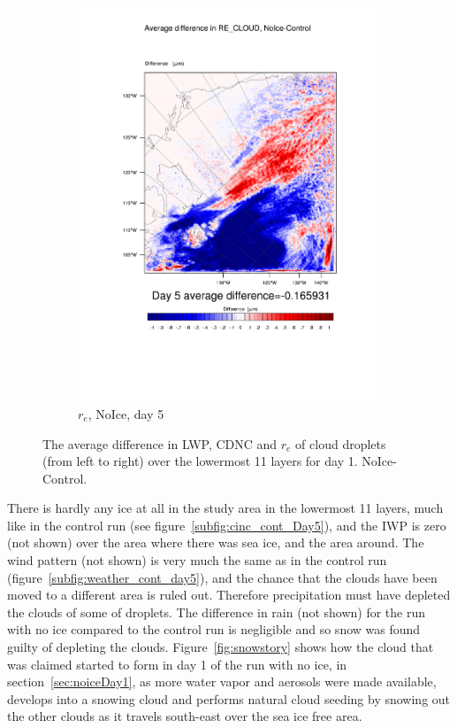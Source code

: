 \begin{figure}[hb]
	\begin{subfigure}{0.40\textwidth}
		\centering
		\includegraphics[width=\textwidth]{results/noice/diff_NoIce_RE_CLOUD_Day5.pdf}
		\caption{$r_e$, NoIce, day 5}
		\label{subfig:recloud_r2Day5}
	\end{subfigure}
\caption{The average difference in LWP, CDNC and $r_e$ of cloud droplets (from left to right) over the lowermost 11 layers for day 1. NoIce-Control.}
\label{fig:lwpcdncre_r2Day5}
\end{figure}

There is hardly any ice at all in the study area in the lowermost 11 layers, much like in the control run (see figure~\ref{subfig:cinc_cont_Day5}), and the IWP is zero (not shown) over the area where there was sea ice, and the area around. The wind pattern (not shown) is very much the same as in the control run (figure~\ref{subfig:weather_cont_day5}), and the chance that the clouds have been moved to a different area is ruled out. Therefore precipitation must have depleted the clouds of some of droplets. The difference in rain (not shown) for the run with no ice compared to the control run is negligible and so snow was found guilty of depleting the clouds. Figure~\ref{fig:snowstory} shows how the cloud that was claimed started to form in day 1 of the run with no ice, in section~\ref{sec:noiceDay1}, as more water vapor and aerosols were made available, develops into a snowing cloud and performs natural cloud seeding by snowing out the other clouds as it travels south-east over the sea ice free area.

